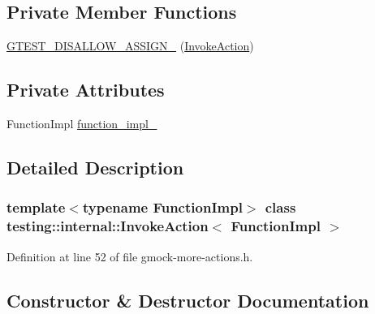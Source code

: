 \subsection*{Private Member Functions}
\begin{DoxyCompactItemize}
\item 
\hyperlink{classtesting_1_1internal_1_1InvokeAction_a7fc4b4fad2b22e50dd818db00a8d7bb9}{G\+T\+E\+S\+T\+\_\+\+D\+I\+S\+A\+L\+L\+O\+W\+\_\+\+A\+S\+S\+I\+G\+N\+\_\+} (\hyperlink{classtesting_1_1internal_1_1InvokeAction}{Invoke\+Action})
\end{DoxyCompactItemize}
\subsection*{Private Attributes}
\begin{DoxyCompactItemize}
\item 
Function\+Impl \hyperlink{classtesting_1_1internal_1_1InvokeAction_afe2a9f6157cfd9c8b369987411f53337}{function\+\_\+impl\+\_\+}
\end{DoxyCompactItemize}


\subsection{Detailed Description}
\subsubsection*{template$<$typename Function\+Impl$>$\newline
class testing\+::internal\+::\+Invoke\+Action$<$ Function\+Impl $>$}



Definition at line 52 of file gmock-\/more-\/actions.\+h.



\subsection{Constructor \& Destructor Documentation}
\mbox{\label{classtesting_1_1internal_1_1InvokeAction_a786ce772624fc87a31891f465df7ce61}} 
